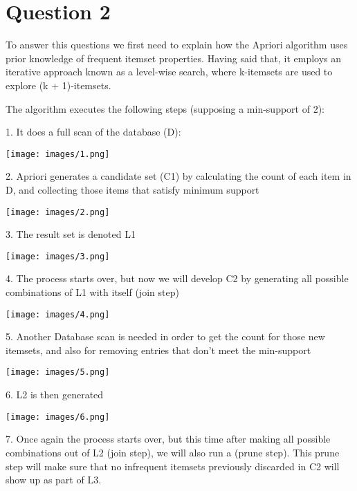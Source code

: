 \documentclass[a4paper]{article}
\begin{document}
\section*{Question 2}

To answer this questions we first need to explain how the Apriori algorithm uses prior knowledge of frequent itemset properties. Having said that, it employs an iterative approach known as a level-wise search, where k-itemsets are used to explore (k + 1)-itemsets.

\newpage

The algorithm executes the following steps (supposing a min-support of 2):

1. It does a full scan of the database (D):

\begin{center}
\texttt{[image: images/1.png]}
\end{center}

2. Apriori generates a candidate set (C1) by calculating the count of each item in D, and collecting those items that satisfy minimum support

\begin{center}
\texttt{[image: images/2.png]}
\end{center}

3. The result set is denoted L1

\begin{center}
\texttt{[image: images/3.png]}
\end{center}

4. The process starts over, but now we will develop C2 by generating all possible combinations of L1 with itself (join step)

\begin{center}
\texttt{[image: images/4.png]}
\end{center}

5. Another Database scan is needed in order to get the count for those new itemsets, and also for removing entries that don't meet the min-support

\begin{center}
\texttt{[image: images/5.png]}
\end{center}

6. L2 is then generated

\begin{center}
\texttt{[image: images/6.png]}
\end{center}

7. Once again the process starts over, but this time after making all possible combinations out of L2 (join step), we will also run a (prune step). This prune step will make sure that no infrequent itemsets previously discarded in C2 will show up as part of L3.
\end{document}

